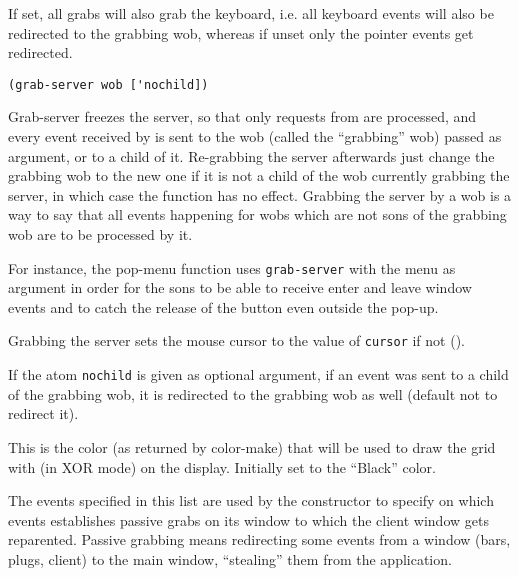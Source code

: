 If set, all grabs will also grab the keyboard, i.e. all keyboard events will
also be redirected to the grabbing wob, whereas if unset only the pointer
events get redirected.

        
{\usagefont\begin{verbatim}
(grab-server wob ['nochild])
\end{verbatim}}\usageupspace

Grab-server freezes the server, so that only requests from {\GWM} are
processed, and every event received by {\GWM} is sent to the wob (called the
``grabbing'' wob) passed as argument, or to a child of it. Re-grabbing the
server afterwards just change the grabbing wob to the new one if it is not a
child of the wob currently grabbing the server, in which case the function
has no effect. Grabbing the server by a wob is a way to say that all events
happening for wobs which are not sons of the grabbing wob are to be
processed by it.

For instance, the pop-menu function uses \verb"grab-server" with the menu as
argument in order for the sons to be able to receive enter and leave window
events and to catch the release of the button even outside the pop-up.

Grabbing the server sets the mouse cursor to the value of \verb"cursor" if not
().

If the atom \verb"nochild" is given as optional argument, if an event
was sent to a child of the grabbing wob, it is redirected to the grabbing
wob as well (default not to redirect it).

        

This is the color (as returned by color-make) that will be used to draw the
grid with (in XOR mode) on the display. Initially set to the
``Black'' color.



The events specified in this list are used by the 
constructor to specify on which events {\GWM} establishes passive
grabs on its window to which the client window gets reparented. Passive
grabbing means redirecting some events from a window (bars, plugs, client)
to the main window, ``stealing'' them from the application.

